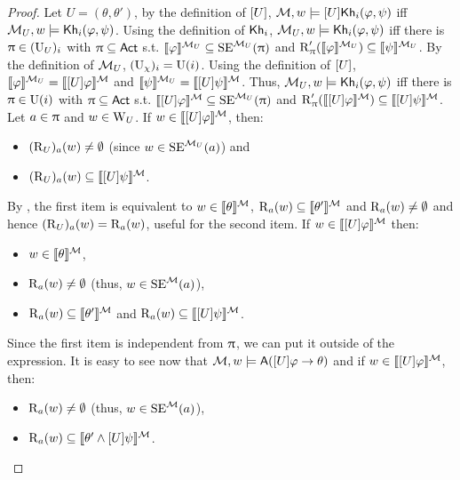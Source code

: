 \begin{proof}
	Let $U = (\theta,\theta')$, by the definition of $[U]$, $\mathcal{M},w \models [U]{\sf Kh}_i(\varphi,\psi)$ iff $\mathcal{M}_{{U}},w \models {\sf Kh}_i(\varphi,\psi)$.
	Using the definition of ${\sf Kh}_i$, $\mathcal{M}_{{U}},w \models {\sf Kh}_i(\varphi,\psi)$ iff there is $\uppi \in (\operatorname{U}_{{U}})_i$ with $\uppi \subseteq {\rm \sf Act}$ s.t. $\llbracket \varphi \rrbracket^{\mathcal{M}_{{U}}} \subseteq \operatorname{SE}^{\mathcal{M}_{{U}}}(\uppi)$ and $\operatorname{R}'_\uppi(\llbracket \varphi \rrbracket^{\mathcal{M}_{{U}}}) \subseteq \llbracket \psi \rrbracket^{\mathcal{M}_{{U}}}$.
	By the definition of $\mathcal{M}_{{U}}$, $(\operatorname{U}_{{\chi}})_i=\operatorname{U}(i)$. Using the definition of $[U]$, $\llbracket \varphi \rrbracket^{\mathcal{M}_{{U}}} = \llbracket [U]\varphi \rrbracket^{\mathcal{M}}$ and $\llbracket \psi \rrbracket^{\mathcal{M}_{{U}}} = \llbracket [U]\psi \rrbracket^{\mathcal{M}}$.
	Thus, $\mathcal{M}_{{U}},w \models {\sf Kh}_i(\varphi,\psi)$ iff there is $\uppi \in \operatorname{U}(i)$ with $\uppi \subseteq {\rm \sf Act}$ s.t. $\llbracket [U]\varphi \rrbracket^{\mathcal{M}} \subseteq \operatorname{SE}^{\mathcal{M}_{{U}}}(\uppi)$ and $\operatorname{R}'_\uppi(\llbracket [U]\varphi \rrbracket^{\mathcal{M}}) \subseteq \llbracket [U]\psi \rrbracket^{\mathcal{M}}$.
	Let $a \in \uppi$ and $w \in \operatorname{W}_{{U}}$. If $w \in \llbracket [U]\varphi \rrbracket^{\mathcal{M}}$, then:
	\begin{itemize}
	\item $(\operatorname{R}_{{U}})_a(w) \neq \emptyset$ (since $w \in \operatorname{SE}^{\mathcal{M}_{{U}}}(a)$) and
	\item $(\operatorname{R}_{{U}})_a(w) \subseteq \llbracket [U]\psi \rrbracket^{\mathcal{M}}$.
	\end{itemize}
	By , the first item is equivalent to $w \in \llbracket \theta \rrbracket^{\mathcal{M}}$, $\operatorname{R}_a(w) \subseteq \llbracket \theta' \rrbracket^{\mathcal{M}}$ and $\operatorname{R}_a(w) \neq \emptyset$ and hence $(\operatorname{R}_{{U}})_a(w) = \operatorname{R}_a(w)$, useful for the second item.
	If $w \in \llbracket [U]\varphi \rrbracket^{\mathcal{M}}$ then:
	\begin{itemize}
	\item $w \in \llbracket \theta \rrbracket^{\mathcal{M}}$,
	\item $\operatorname{R}_a(w) \neq \emptyset$ (thus, $w \in \operatorname{SE}^{\mathcal{M}}(a)$),
	\item $\operatorname{R}_a(w) \subseteq \llbracket \theta' \rrbracket^{\mathcal{M}}$ and $\operatorname{R}_a(w) \subseteq \llbracket [U]\psi \rrbracket^{\mathcal{M}}$.
	\end{itemize}
	Since the first item is independent from $\uppi$, we can put it outside of the expression.
	It is easy to see now that $\mathcal{M},w \models {\sf A}([U]\varphi \rightarrow \theta)$ and if $w \in \llbracket [U]\varphi \rrbracket^{\mathcal{M}}$, then:
	\begin{itemize}
	\item $\operatorname{R}_a(w) \neq \emptyset$ (thus, $w \in \operatorname{SE}^{\mathcal{M}}(a)$),
	\item $\operatorname{R}_a(w) \subseteq \llbracket \theta' \wedge [U]\psi \rrbracket^{\mathcal{M}}$.
	\end{itemize}
	

\end{proof}
